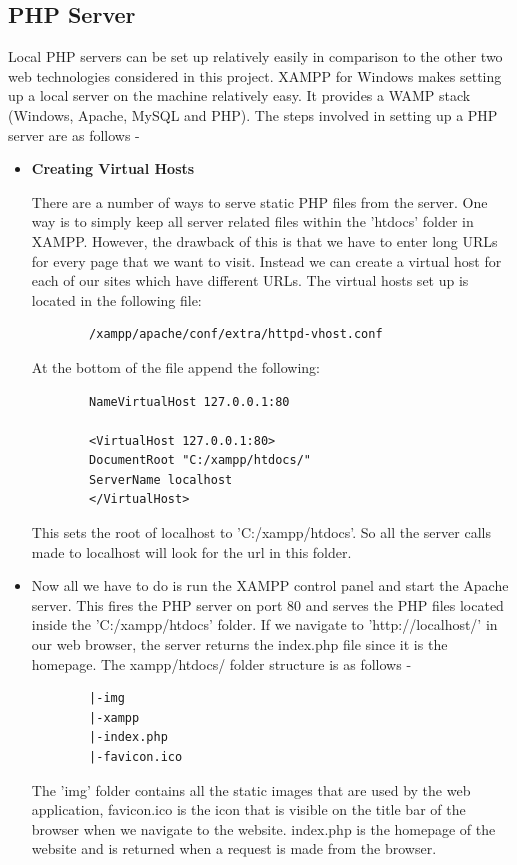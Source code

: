 \documentclass[../thesis.tex]{subfiles}
\begin{document}
	\subsection*{PHP Server}
	Local PHP servers can be set up relatively easily in comparison to the other two web technologies considered in this project. XAMPP for Windows makes setting up a local server on the machine relatively easy. It provides a WAMP stack (Windows, Apache, MySQL and PHP). The steps involved in setting up a PHP server are as follows -
	\newline

	\begin{itemize}
		\item \textbf{Creating Virtual Hosts}
		\newline

		There are a number of ways to serve static PHP files from the server. One way is to simply keep all server related files within the 'htdocs' folder in XAMPP. However, the drawback of this is that we have to enter long URLs for every page that we want to visit. Instead we can create a virtual host for each of our sites which have different URLs. The virtual hosts set up is located in the following file: 
		\begin{verbatim}
		/xampp/apache/conf/extra/httpd-vhost.conf
		\end{verbatim}
		At the bottom of the file append the following:
		\begin{verbatim}
		NameVirtualHost 127.0.0.1:80
		
		<VirtualHost 127.0.0.1:80>
		DocumentRoot "C:/xampp/htdocs/"
		ServerName localhost
		</VirtualHost>
		\end{verbatim}
		This sets the root of localhost to 'C:/xampp/htdocs'. So all the server calls made to localhost will look for the url in this folder. 
		\smallskip
		\item Now all we have to do is run the XAMPP control panel and start the Apache server. This fires the PHP server on port 80 and serves the PHP files located inside the 'C:/xampp/htdocs' folder. If we navigate to 'http://localhost/' in our web browser, the server returns the index.php file since it is the homepage. The xampp/htdocs/ folder structure is as follows - 
		\begin{verbatim}
		|-img
		|-xampp
		|-index.php
		|-favicon.ico
		\end{verbatim}
		The 'img' folder contains all the static images that are used by the web application, favicon.ico is the icon that is visible on the title bar of the browser when we navigate to the website. index.php is the homepage of the website and is returned when a request is made from the browser.
	\end{itemize}
	
\end{document}
